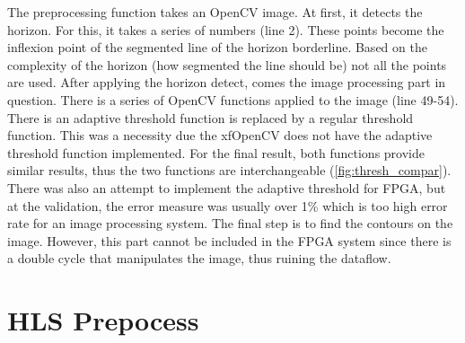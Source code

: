The preprocessing function takes an OpenCV image.
At first, it detects the horizon.
For this, it takes a series of numbers (line 2).
These points become the inflexion point of the segmented line of the horizon borderline.
Based on the complexity of the horizon (how segmented the line should be) not all the points are used.
After applying the horizon detect, comes the image processing part in question.
There is a series of OpenCV functions applied to the image (line 49-54).
There is an adaptive threshold function is replaced by a regular threshold function.
This was a necessity due the xfOpenCV does not have the adaptive threshold function implemented.
For the final result, both functions provide similar results, thus the two functions are interchangeable (\cref{fig:thresh_compar}).
There was also an attempt to implement the adaptive threshold for FPGA, but at the validation, the error measure was usually over 1\% which is too high error rate for an image processing system.
The final step is to find the contours on the image.
However, this part cannot be included in the FPGA system since there is a double cycle that manipulates the image, thus ruining the dataflow.

\section{HLS Prepocess} %

